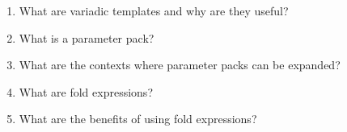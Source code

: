 \begin{enumerate}
\item
What are variadic templates and why are they useful?

\item
What is a parameter pack?

\item
What are the contexts where parameter packs can be expanded?

\item
What are fold expressions?

\item
What are the benefits of using fold expressions?
\end{enumerate}